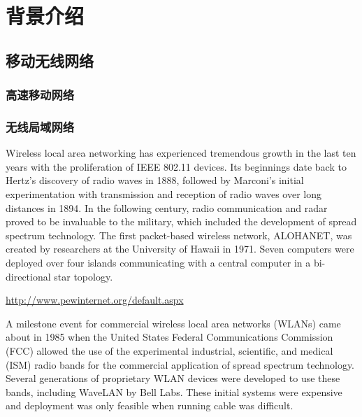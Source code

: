 
\chapter{背景介绍}
\label{chap:background}


\section{移动无线网络}
\label{sec:mobile}

\subsection{高速移动网络}
\label{sec:gsmr}


\subsection{无线局域网络}
\label{sec:80211n}

Wireless local area networking has experienced tremendous growth in the last ten years
with the proliferation of IEEE 802.11 devices. Its beginnings date back to Hertz’s discovery
of radio waves in 1888, followed by Marconi’s initial experimentation with
transmission and reception of radio waves over long distances in 1894. In the following
century, radio communication and radar proved to be invaluable to the military, which
included the development of spread spectrum technology. The first packet-based wireless
network, ALOHANET, was created by researchers at the University of Hawaii in
1971. Seven computers were deployed over four islands communicating with a central
computer in a bi-directional star topology.

\url{http://www.pewinternet.org/default.aspx}

A milestone event for commercial wireless local area networks (WLANs) came
about in 1985 when the United States Federal Communications Commission (FCC)
allowed the use of the experimental industrial, scientific, and medical (ISM) radio bands
for the commercial application of spread spectrum technology. Several generations of
proprietary WLAN devices were developed to use these bands, including WaveLAN by
Bell Labs. These initial systems were expensive and deployment was only feasible when
running cable was difficult.


